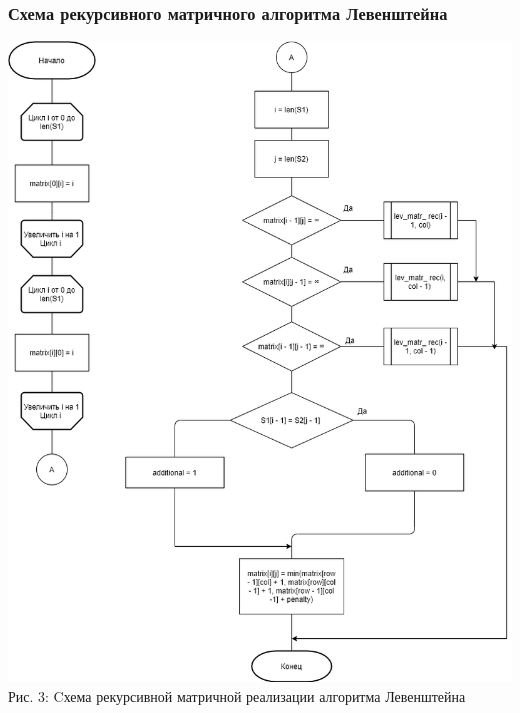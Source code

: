 \documentclass[12pt,a4paper]{article}
\begin{document}
\subsubsection{Схема рекурсивного матричного алгоритма Левенштейна}
\begin{center}
	\includegraphics[width=1\linewidth]{lev_matr_rec}\\
	Рис. 3: Cхема рекурсивной матричной реализации алгоритма Левенштейна
\end{center}
\clearpage
\end{document}
